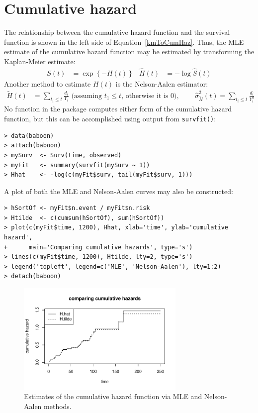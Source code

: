 \documentclass[article]{jss}
\begin{document}
\section[Cumulative hazard]{Cumulative hazard}
\label{cumulativeHazard}

The relationship between the cumulative hazard function and the survival function is shown in the left side of Equation~\eqref{kmToCumHaz}. Thus, the MLE estimate of the cumulative hazard function may be estimated by transforming the Kaplan-Meier estimate:
\begin{align}\label{kmToCumHaz}
S(t) &= \exp\left\{-H(t)\right\}
&\hat{H}(t) &= -\log\hat{S}(t)
\end{align}
Another method to estimate $H(t)$ is the Nelson-Aalen estimator:
\begin{align*}
\widetilde{H}(t) &= \sum_{t_i \leq t} \frac{d_i}{Y_i}\text{ (assuming }t_1\leq t\text{, otherwise it is 0), }
		\qquad \hat{\sigma}_{\widetilde{H}}^2(t) = \sum_{t_i\leq t}\frac{d_i}{Y_i^2}
\end{align*}
No function in the  package computes either form of the cumulative hazard function, but this can be accomplished using output from \texttt{survfit()}:
\begin{verbatim}
> data(baboon)
> attach(baboon)
> mySurv  <- Surv(time, observed)
> myFit   <- summary(survfit(mySurv ~ 1))
> Hhat    <- -log(c(myFit$surv, tail(myFit$surv, 1)))
\end{verbatim}
A plot of both the MLE and Nelson-Aalen curves may also be constructed:
\begin{verbatim}
> hSortOf <- myFit$n.event / myFit$n.risk
> Htilde  <- c(cumsum(hSortOf), sum(hSortOf))
> plot(c(myFit$time, 1200), Hhat, xlab='time', ylab='cumulative hazard',
+      main='Comparing cumulative hazards', type='s')
> lines(c(myFit$time, 1200), Htilde, lty=2, type='s')
> legend('topleft', legend=c('MLE', 'Nelson-Aalen'), lty=1:2)
> detach(baboon)
\end{verbatim}
\begin{figure}[htp]
\centering
\includegraphics[width=0.72\textwidth]{../../figures/cumHazard}
\caption{Estimates of the cumulative hazard function via MLE and Nelson-Aalen methods.}
\label{cumHazard}
\end{figure}
\end{document}
